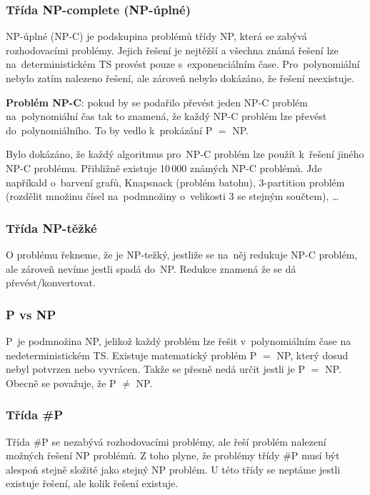 \subsubsection{Třída NP-complete (NP-úplné)}

NP-úplné (NP-C) je podskupina problémů třídy NP, která se zabývá rozhodovacími problémy.
Jejich řešení je nejtěžší a všechna známá řešení lze na~deterministickém TS provést pouze s~exponenciálním čase. 
Pro~polynomiální nebylo zatím nalezeno řešení, ale zároveň nebylo dokázáno, že řešení neexistuje.

\textbf{Problém NP-C}: pokud by se podařilo převést jeden NP-C problém na~polynomiální čas tak to znamená, že každý NP-C problém lze převést do~polynomiálního. 
To by vedlo k~prokázání P $=$ NP.

Bylo dokázáno, že každý algoritmus pro~NP-C problém lze použít k~řešení jiného \mbox{NP-C} problému.
Přibližně existuje 10\,000 známých NP-C problémů.
Jde napříkald o~barvení grafů, Knapsnack (problém batohu), 3-partition problém (rozdělit množinu čísel na~podmnožiny o~velikosti 3 se stejným součtem), \dots

\subsubsection{Třída NP-těžké}

O problému řekneme, že je NP-težký, jestliže se na~něj redukuje NP-C problém, ale zároveň nevíme jestli spadá do~NP.
Redukce znamená že se dá převést/konvertovat.

\subsubsection{P vs NP}

P~je podmnožina NP, jelikož každý problém lze řešit v~polynomiálním čase na
 nedeterministickém TS.
Existuje matematický problém P $=$ NP, který dosud nebyl potvrzen nebo vyvrácen. Takže se přesně nedá určit jestli je P $=$ NP. 
Obecně se považuje, že P $\neq$ NP.

\subsubsection{Třída \#P}

Třída \#P se nezabývá rozhodovacími problémy, ale řeší problém nalezení možných řešení NP problémů. 
Z toho plyne, že problémy třídy \#P musí být alespoň stejně složité jako stejný NP problém.
U této třídy se neptáme jestli existuje řešení, ale kolik řešení existuje.

